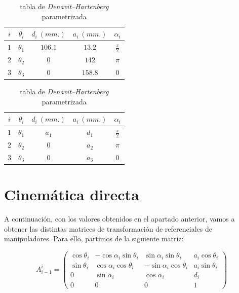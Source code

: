 \documentclass[a4paper,12pt]{article}
\begin{document}
\begin{table}[H]
    \parbox{.45\linewidth}{
        \centering
        \begin{tabular}{ c | c c c c }
            $i$ & $\theta_i$ & $d_i~(mm.)$ & $a_i~(mm.)$ & $\alpha_i$      \\ [0.5ex]
            \hline
            $1$ & $\theta_1$ & $106.1$     & $13.2$      & $\frac{\pi}{2}$ \\
            $2$ & $\theta_2$ & $0$         & $142$       & $\pi$           \\
            $3$ & $\theta_3$ & $0$         & $158.8$     & $0$             \\ [1ex]
        \end{tabular}
        \caption{tabla de \textit{Denavit–Hartenberg}}
    }
    \hfill
    \parbox{.45\linewidth}{
        \centering
        \begin{tabular}{ c | c c c c }
            $i$ & $\theta_i$ & $d_i~(mm.)$ & $a_i~(mm.)$ & $\alpha_i$      \\ [0.5ex]
            \hline
            $1$ & $\theta_1$ & $a_1$       & $d_1$       & $\frac{\pi}{2}$ \\
            $2$ & $\theta_2$ & $0$         & $a_2$       & $\pi$           \\
            $3$ & $\theta_3$ & $0$         & $a_3$       & $0$             \\ [1ex]
        \end{tabular}
        \caption{tabla de \textit{Denavit–Hartenberg} parametrizada}
    }
\end{table}
\newpage
\section{Cinemática directa}
A continuación, con los valores obtenidos en el apartado anterior, vamos a obtener las
distintas matrices de transformación de referenciales de manipuladores. Para ello, partimos de la
siguiente matriz:

\[
    A_{i-1}^i =
    \begin{pmatrix}
        \cos\theta_i & -\cos\alpha_i\sin\theta_i & \sin\alpha_i\sin\theta_i  & a_i\cos\theta_i \\
        \sin\theta_i & \cos\alpha_i\cos\theta_i  & -\sin\alpha_i\cos\theta_i & a_i\sin\theta_i \\
        0            & \sin\alpha_i              & \cos\alpha_i              & d_i             \\
        0            & 0                         & 0                         & 1
    \end{pmatrix}
\]
\end{document}
